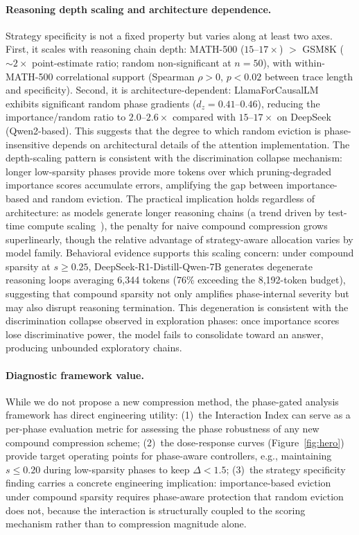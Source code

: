 \paragraph{Reasoning depth scaling and architecture dependence.}
Strategy specificity is not a fixed property but varies along at least two axes. First, it scales with reasoning chain depth: MATH-500 ($15$--$17{\times}$) $>$ GSM8K (${\sim}2{\times}$ point-estimate ratio; random non-significant at $n{=}50$), with within-MATH-500 correlational support (Spearman $\rho > 0$, $p < 0.02$ between trace length and specificity). Second, it is architecture-dependent: LlamaForCausalLM exhibits significant random phase gradients ($d_z{=}0.41$--$0.46$), reducing the importance/random ratio to $2.0$--$2.6{\times}$ compared with $15$--$17{\times}$ on DeepSeek (Qwen2-based). This suggests that the degree to which random eviction is phase-insensitive depends on architectural details of the attention implementation. The depth-scaling pattern is consistent with the discrimination collapse mechanism: longer low-sparsity phases provide more tokens over which pruning-degraded importance scores accumulate errors, amplifying the gap between importance-based and random eviction. The practical implication holds regardless of architecture: as models generate longer reasoning chains (a trend driven by test-time compute scaling~\cite{snell-2024-scaling-test-time}), the penalty for naive compound compression grows superlinearly, though the relative advantage of strategy-aware allocation varies by model family. Behavioral evidence supports this scaling concern: under compound sparsity at $s \geq 0.25$, DeepSeek-R1-Distill-Qwen-7B generates degenerate reasoning loops averaging 6{,}344 tokens (76\% exceeding the 8{,}192-token budget), suggesting that compound sparsity not only amplifies phase-internal severity but may also disrupt reasoning termination. This degeneration is consistent with the discrimination collapse observed in exploration phases: once importance scores lose discriminative power, the model fails to consolidate toward an answer, producing unbounded exploratory chains.

\paragraph{Diagnostic framework value.}
While we do not propose a new compression method, the phase-gated analysis framework has direct engineering utility: (1)~the Interaction Index can serve as a per-phase evaluation metric for assessing the phase robustness of any new compound compression scheme; (2)~the dose-response curves (Figure~\ref{fig:hero}) provide target operating points for phase-aware controllers, e.g., maintaining $s \leq 0.20$ during low-sparsity phases to keep $\Delta < 1.5$; (3)~the strategy specificity finding carries a concrete engineering implication: importance-based eviction under compound sparsity requires phase-aware protection that random eviction does not, because the interaction is structurally coupled to the scoring mechanism rather than to compression magnitude alone.

